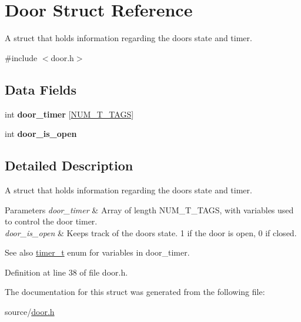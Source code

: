 \hypertarget{structDoor}{}\section{Door Struct Reference}
\label{structDoor}


A struct that holds information regarding the door\textquotesingle{}s state and timer.  




{\ttfamily \#include $<$door.\+h$>$}

\subsection*{Data Fields}
\begin{DoxyCompactItemize}
\item 
\mbox{\label{structDoor_aa5e2ba489f890ed656ac936513fd90fb}} 
int {\bfseries door\+\_\+timer} \mbox{[}\mbox{\hyperlink{door_8h_a764f517e2e45ad48bcd8b88590ab5276a7314652df30c259bec1d360788aef62c}{N\+U\+M\+\_\+\+T\+\_\+\+T\+A\+GS}}\mbox{]}
\item 
\mbox{\label{structDoor_a7e103b2e2527ecdead0dfd1f07366de9}} 
int {\bfseries door\+\_\+is\+\_\+open}
\end{DoxyCompactItemize}


\subsection{Detailed Description}
A struct that holds information regarding the door\textquotesingle{}s state and timer. 


\begin{DoxyParams}{Parameters}
{\em door\+\_\+timer} & Array of length N\+U\+M\+\_\+\+T\+\_\+\+T\+A\+GS, with variables used to control the door timer. \\
\hline
{\em door\+\_\+is\+\_\+open} & Keeps track of the door\textquotesingle{}s state. 1 if the door is open, 0 if closed. \\
\hline
\end{DoxyParams}
\begin{DoxySeeAlso}{See also}
\mbox{\hyperlink{door_8h_a764f517e2e45ad48bcd8b88590ab5276}{timer\+\_\+t}} enum for variables in {\ttfamily door\+\_\+timer}. 
\end{DoxySeeAlso}


Definition at line 38 of file door.\+h.



The documentation for this struct was generated from the following file\+:\begin{DoxyCompactItemize}
\item 
source/\mbox{\hyperlink{door_8h}{door.\+h}}\end{DoxyCompactItemize}
